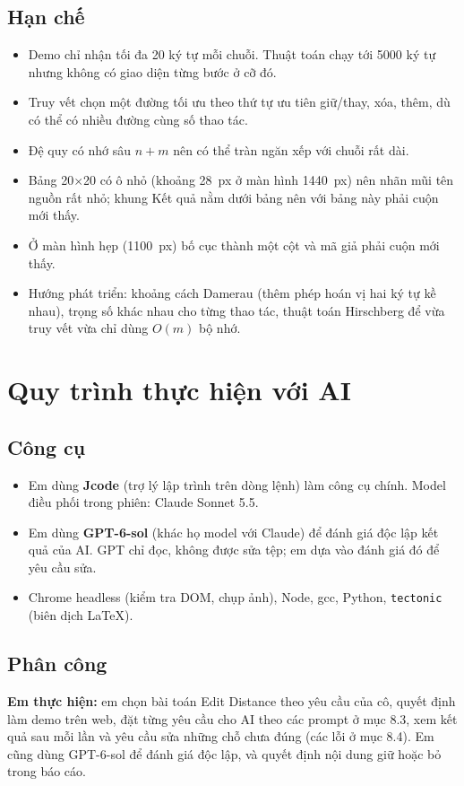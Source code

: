 \documentclass[12pt,a4paper]{article}
\newcommand{\code}[1]{\texttt{#1}}
\begin{document}
\subsection{Hạn chế}
\begin{itemize}[nosep]
  \item Demo chỉ nhận tối đa 20 ký tự mỗi chuỗi. Thuật toán chạy tới 5000 ký tự nhưng không có giao diện từng bước ở cỡ đó.
  \item Truy vết chọn một đường tối ưu theo thứ tự ưu tiên giữ/thay, xóa, thêm, dù có thể có nhiều đường cùng số thao tác.
  \item Đệ quy có nhớ sâu $n+m$ nên có thể tràn ngăn xếp với chuỗi rất dài.
  \item Bảng 20$\times$20 có ô nhỏ (khoảng 28~px ở màn hình 1440~px) nên nhãn mũi tên nguồn rất nhỏ; khung Kết quả nằm dưới bảng nên với bảng này phải cuộn mới thấy.
  \item Ở màn hình hẹp (1100~px) bố cục thành một cột và mã giả phải cuộn mới thấy.
  \item Hướng phát triển: khoảng cách Damerau (thêm phép hoán vị hai ký tự kề nhau), trọng số khác nhau cho từng thao tác, thuật toán Hirschberg để vừa truy vết vừa chỉ dùng $O(m)$ bộ nhớ.
\end{itemize}

\section{Quy trình thực hiện với AI}\label{sec:ai}

\subsection{Công cụ}
\begin{itemize}[nosep]
  \item Em dùng \textbf{Jcode} (trợ lý lập trình trên dòng lệnh) làm công cụ chính. Model điều phối trong phiên: Claude Sonnet 5.5.
  \item Em dùng \textbf{GPT-6-sol} (khác họ model với Claude) để đánh giá độc lập kết quả của AI. GPT chỉ đọc, không được sửa tệp; em dựa vào đánh giá đó để yêu cầu sửa.
  \item Chrome headless (kiểm tra DOM, chụp ảnh), Node, gcc, Python, \code{tectonic} (biên dịch LaTeX).
\end{itemize}

\subsection{Phân công}
\textbf{Em thực hiện:} em chọn bài toán Edit Distance theo yêu cầu của cô, quyết định làm demo trên web, đặt từng yêu cầu cho AI theo các prompt ở mục 8.3, xem kết quả sau mỗi lần và yêu cầu sửa những chỗ chưa đúng (các lỗi ở mục 8.4). Em cũng dùng GPT-6-sol để đánh giá độc lập, và quyết định nội dung giữ hoặc bỏ trong báo cáo.
\end{document}
